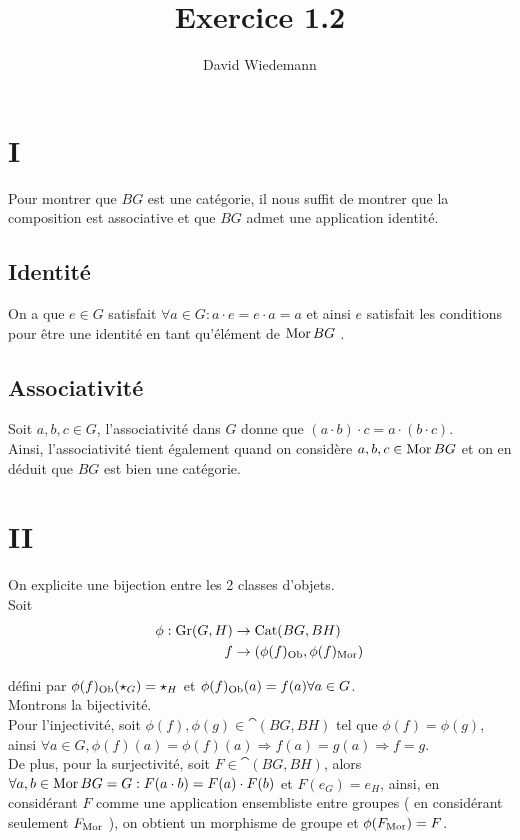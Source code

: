 \documentclass[11pt, a4paper]{article}
\begin{document}
\title{Exercice 1.2}
\author{David Wiedemann}
\maketitle
\section*{I}
Pour montrer que $BG$ est une catégorie, il nous suffit de montrer que la composition est associative et que $BG$ admet une application identité.
\subsection*{Identité}
On a que $e \in G$ satisfait $ \forall a  \in G : a \cdot e = e \cdot a = a$ et ainsi $e$ satisfait les conditions pour être une identité en tant qu'élément de $\operatorname{Mor} BG$ .\\
\subsection*{Associativité}
Soit $a,b,c\in G$, l'associativité dans $G$ donne que $( a\cdot b) \cdot c= a \cdot ( b \cdot c).$\\
Ainsi, l'associativité tient également quand on considère $a,b,c \in \operatorname{Mor} BG$ et on en déduit que $BG$ est bien une catégorie.
\section*{II}
On explicite une bijection entre les 2 classes d'objets.\\
Soit 
\begin{align*}
	\phi: \operatorname{Gr}( G,H) &\to \operatorname{Cat}( BG,BH) \\
	f &\to ( \phi( f)_{\operatorname{Ob}}, \phi( f) _{\operatorname{Mor}} ) 
\end{align*}

défini par
$\phi ( f)_{\operatorname{Ob}} ( \star_G) = \star_{H} $ et $\phi( f) _{\operatorname{Ob}} ( a) = f( a) \forall a \in G $.\\
Montrons la bijectivité.\\

Pour l'injectivité, soit $\phi( f) ,\phi( g) \in \cat ( BG,BH) $ tel que $\phi( f) =\phi( g) $, ainsi $\forall a \in G, \phi( f) ( a) = \phi( f) ( a) \Rightarrow  f( a) =g( a) \Rightarrow f=g  $.\\
De plus, pour la surjectivité, soit $F \in \cat ( BG,BH) $, alors $\forall a,b \in \operatorname{Mor} BG = G:  F( a\cdot b) = F( a) \cdot F( b) $ et $F( e_G )= e_H$, ainsi, en considérant $F$ comme une application ensembliste entre groupes ( en considérant seulement $F_{\operatorname{Mor}} $ ), on obtient un morphisme de groupe et $\phi( F_{\operatorname{Mor}} ) = F$.
\end{document}
